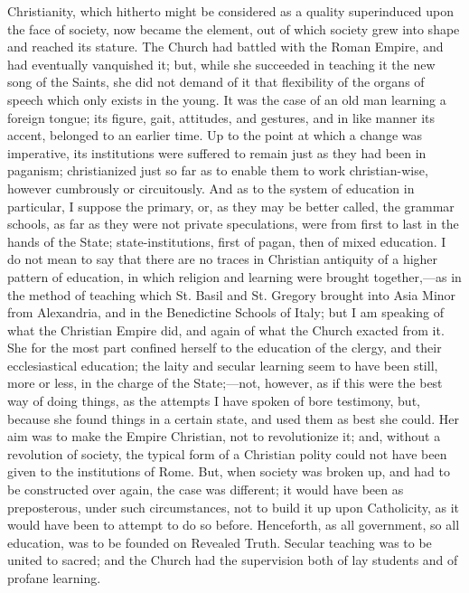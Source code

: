 Christianity, which hitherto
might be considered as a quality superinduced upon the face of
society, now became the element, out of which society grew into shape
and reached its stature. The Church had battled with the Roman
Empire, and had eventually vanquished it; but, while she succeeded in
teaching it the new song of the Saints, she did not demand of it that
flexibility of the organs of speech which only exists in the young. It
was the case of an old man learning a foreign tongue; its figure,
gait, attitudes, and gestures, and in like manner its accent, belonged
to an earlier time. Up to the point at which a change was imperative,
its institutions were suffered to remain just as they had been in
paganism; christianized just so far as to enable them to work
christian-wise, however cumbrously or circuitously. And as to the
system of education in particular, I suppose the primary, or, as they
may be better called, the grammar schools, as far as they were not
private speculations, were from first to last in the hands of the
State; state-institutions, first of pagan, then of mixed education. I
do not mean to say that there are no traces in Christian antiquity of
a higher pattern of education, in which religion and learning were
brought together,—as in the method of teaching which St. Basil and
St. Gregory brought into Asia Minor from Alexandria, and in the
Benedictine Schools of Italy; but I am speaking of what the Christian
Empire did, and again of what the Church exacted from it. She for the
most part confined herself to the education of the clergy, and their
ecclesiastical education; the laity and secular learning seem to have
been still, more or less, in the charge of the State;—not, however,
as if this were the best way of doing things, as the attempts I have
spoken of bore testimony, but, because she found things in a certain
state, and used them as best she could. Her aim was to make the Empire
Christian, not to revolutionize it; and, without a revolution of
society, the typical form of a Christian polity could not have been
given to the institutions of Rome. But, when society was broken
up, and had to be constructed over again, the case was different; it
would have been as preposterous, under such circumstances, not to
build it up upon Catholicity, as it would have been to attempt to do
so before. Henceforth, as all government, so all education, was to be
founded on Revealed Truth. Secular teaching was to be united to
sacred; and the Church had the supervision both of lay students and of
profane learning.

